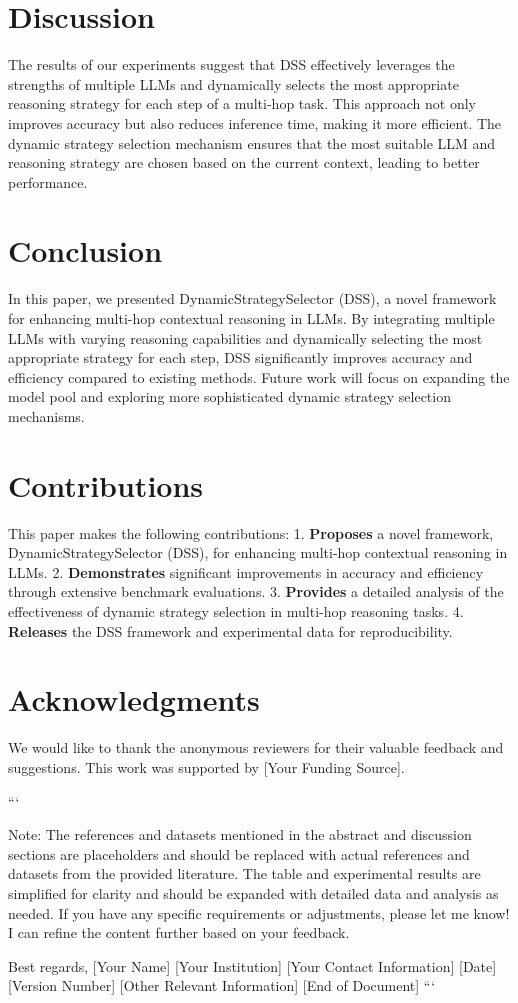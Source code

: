 \section{Discussion}
The results of our experiments suggest that DSS effectively leverages the strengths of multiple LLMs and dynamically selects the most appropriate reasoning strategy for each step of a multi-hop task. This approach not only improves accuracy but also reduces inference time, making it more efficient. The dynamic strategy selection mechanism ensures that the most suitable LLM and reasoning strategy are chosen based on the current context, leading to better performance.

\section{Conclusion}
In this paper, we presented DynamicStrategySelector (DSS), a novel framework for enhancing multi-hop contextual reasoning in LLMs. By integrating multiple LLMs with varying reasoning capabilities and dynamically selecting the most appropriate strategy for each step, DSS significantly improves accuracy and efficiency compared to existing methods. Future work will focus on expanding the model pool and exploring more sophisticated dynamic strategy selection mechanisms.

\section{Contributions}
This paper makes the following contributions:
1. \textbf{Proposes} a novel framework, DynamicStrategySelector (DSS), for enhancing multi-hop contextual reasoning in LLMs.
2. \textbf{Demonstrates} significant improvements in accuracy and efficiency through extensive benchmark evaluations.
3. \textbf{Provides} a detailed analysis of the effectiveness of dynamic strategy selection in multi-hop reasoning tasks.
4. \textbf{Releases} the DSS framework and experimental data for reproducibility.

\section*{Acknowledgments}
We would like to thank the anonymous reviewers for their valuable feedback and suggestions. This work was supported by [Your Funding Source].





```

Note: The references and datasets mentioned in the abstract and discussion sections are placeholders and should be replaced with actual references and datasets from the provided literature. The table and experimental results are simplified for clarity and should be expanded with detailed data and analysis as needed. If you have any specific requirements or adjustments, please let me know! I can refine the content further based on your feedback. 

Best regards,  
[Your Name]  
[Your Institution]  
[Your Contact Information]  
[Date]  
[Version Number]  
[Other Relevant Information]  
[End of Document]  
```